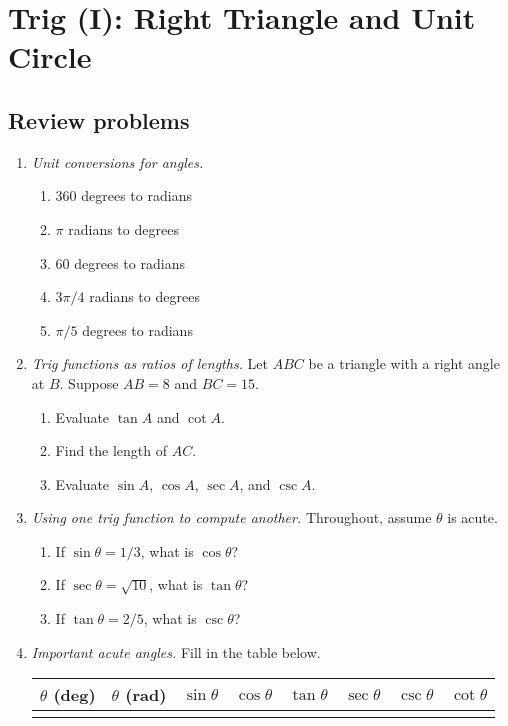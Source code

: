 \section{Trig (I): Right Triangle and Unit Circle}

\subsection{Review problems}

\begin{enumerate}
\item \emph{Unit conversions for angles.}
\begin{enumerate}
\item 360 degrees to radians
\item $\pi$ radians to degrees
\item 60 degrees to radians
\item $3\pi/4$ radians to degrees
\item $\pi/5$ degrees to radians
\end{enumerate}
\item \emph{Trig functions as ratios of lengths.} Let $ABC$ be a triangle with a right angle at $B$. Suppose $AB = 8$ and $BC = 15$.
\begin{enumerate}
\item Evaluate $\tan A$ and $\cot A$.
\item Find the length of $AC$.
\item Evaluate $\sin A$, $\cos A$, $\sec A$, and $\csc A$.
\end{enumerate}
\item \emph{Using one trig function to compute another.} Throughout, assume $\theta$ is acute.
\begin{enumerate}
\item If $\sin\theta = 1/3$, what is $\cos\theta$?
\item If $\sec\theta = \sqrt{10}$, what is $\tan\theta$?
\item If $\tan\theta = 2/5$, what is $\csc\theta$?
\end{enumerate}
\item \emph{Important acute angles.} Fill in the table below.
\begin{center}
\begin{tabular}{c|c||c|c|c|c|c|c}
$\theta$ (deg) & $\theta$ (rad) & $\sin\theta$ & $\cos\theta$ & $\tan\theta$ & $\sec\theta$ & $\csc\theta$ & $\cot\theta$ \\ \hline
 & & & & & & & \\

\end{tabular}
\end{center}
\end{enumerate}
